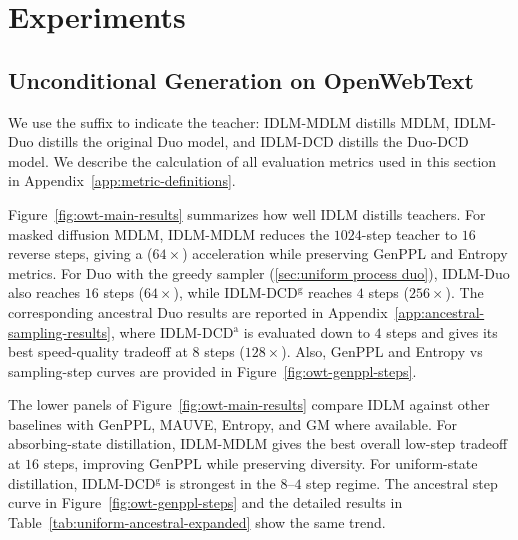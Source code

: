 \vspace{-2mm}
\section{Experiments}
\label{sec:exps}


\subsection{Unconditional Generation on OpenWebText}
\label{sec:openwebtext-results}
We use the suffix to indicate the teacher: IDLM-MDLM distills MDLM, IDLM-Duo distills the original Duo model, and IDLM-DCD distills the Duo-DCD model. We describe the calculation of all evaluation metrics used in this section in Appendix~\ref{app:metric-definitions}.

    Figure~\ref{fig:owt-main-results} summarizes how well IDLM distills teachers. For masked diffusion MDLM, IDLM-MDLM reduces the $1024$-step teacher to $16$ reverse steps, giving a ($64\times$) acceleration while preserving GenPPL and Entropy metrics. For Duo with the greedy sampler (\wasyparagraph\ref{sec:uniform process duo}), IDLM-Duo also reaches $16$ steps ($64\times$), while IDLM-DCD$^{\mathrm{g}}$ reaches $4$ steps ($256\times$). The corresponding ancestral Duo results are reported in Appendix~\ref{app:ancestral-sampling-results}, where IDLM-DCD$^{\mathrm{a}}$ is evaluated down to $4$ steps and gives its best speed-quality tradeoff at $8$ steps ($128\times$). Also, GenPPL and Entropy vs sampling-step curves are provided in Figure~\ref{fig:owt-genppl-steps}.

    The lower panels of Figure~\ref{fig:owt-main-results} compare IDLM against other baselines with GenPPL, MAUVE, Entropy, and GM where available. For absorbing-state distillation, IDLM-MDLM gives the best overall low-step tradeoff at $16$ steps, improving GenPPL while preserving diversity. For uniform-state distillation, IDLM-DCD$^{\mathrm{g}}$ is strongest in the $8$--$4$ step regime. The ancestral step curve in Figure~\ref{fig:owt-genppl-steps} and the detailed results in Table~\ref{tab:uniform-ancestral-expanded} show the same trend.

